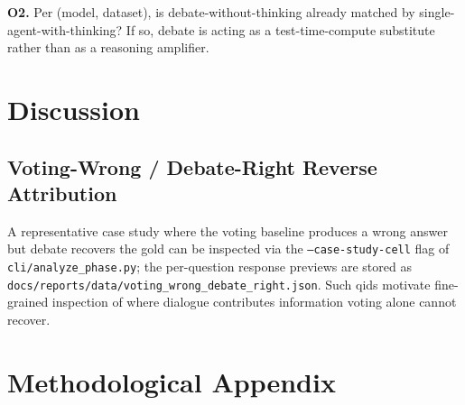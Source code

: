 \documentclass[11pt]{article}
\begin{document}
\textbf{O2.} Per (model, dataset), is debate-without-thinking already
matched by single-agent-with-thinking? If so, debate is acting as a
test-time-compute substitute rather than as a reasoning amplifier.
\begin{center}
\end{center}

\section{Discussion}
\label{sec:discussion}


\subsection{Voting-Wrong / Debate-Right Reverse Attribution}
A representative case study where the voting baseline produces a
wrong answer but debate recovers the gold can be inspected via the
\texttt{--case-study-cell} flag of \texttt{cli/analyze\_phase.py};
the per-question response previews are stored as
\texttt{docs/reports/data/voting\_wrong\_debate\_right.json}. Such
qids motivate fine-grained inspection of where dialogue contributes
information voting alone cannot recover.

\section{Methodological Appendix}
\label{sec:methodological-appendix}

\end{document}
